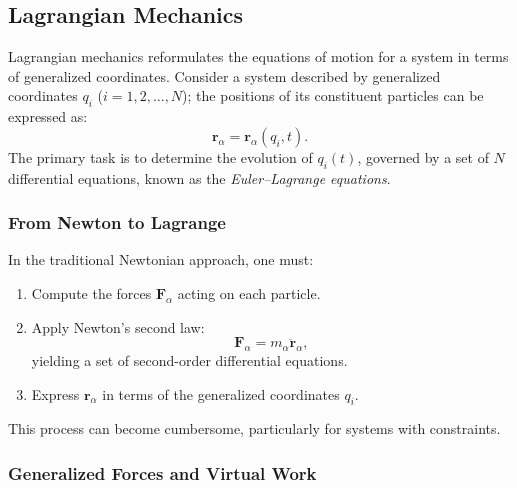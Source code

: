 \subsection{Lagrangian Mechanics}

Lagrangian mechanics reformulates the equations of motion for a system in terms of generalized coordinates. Consider a system described by generalized coordinates \(q_i\) (\(i=1,2,\dots,N\)); the positions of its constituent particles can be expressed as:
\begin{equation}
    \mathbf{r}_\alpha = \mathbf{r}_\alpha(q_i, t).
\end{equation}
The primary task is to determine the evolution of \(q_i(t)\), governed by a set of \(N\) differential equations, known as the \emph{Euler–Lagrange equations}.

\subsubsection*{From Newton to Lagrange}

In the traditional Newtonian approach, one must:
\begin{enumerate}
    \item Compute the forces \(\mathbf{F}_\alpha\) acting on each particle.
    \item Apply Newton's second law:
          \begin{equation}
              \mathbf{F}_\alpha = m_\alpha \ddot{\mathbf{r}}_\alpha,
          \end{equation}
          yielding a set of second-order differential equations.
    \item Express \(\mathbf{r}_\alpha\) in terms of the generalized coordinates \(q_i\).
\end{enumerate}
This process can become cumbersome, particularly for systems with constraints.

\subsubsection*{Generalized Forces and Virtual Work}

